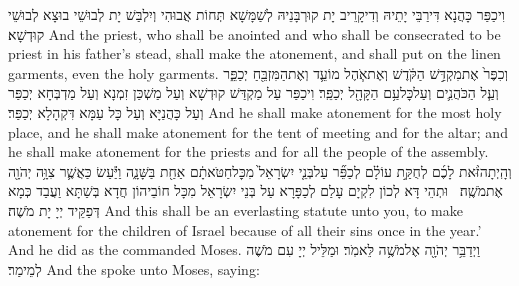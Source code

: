 {וִיכַפַּר כָּהֲנָא דִּירַבֵּי יָתֵיהּ וְדִיקָרֵיב יָת קוּרְבָּנֵיהּ לְשַׁמָּשָׁא תְּחוֹת אֲבוּהִי וְיִלְבַּשׁ יָת לְבוּשֵׁי בוּצָא לְבוּשֵׁי קוּדְשָׁא׃}
{And the priest, who shall be anointed and who shall be consecrated to be priest in his father’s stead, shall make the atonement, and shall put on the linen garments, even the holy garments.}{}
{וְכִפֶּר֙ אֶת\maqqaf מִקְדַּ֣שׁ הַקֹּ֔דֶשׁ וְאֶת\maqqaf אֹ֧הֶל מוֹעֵ֛ד וְאֶת\maqqaf הַמִּזְבֵּ֖חַ יְכַפֵּ֑ר וְעַ֧ל הַכֹּהֲנִ֛ים וְעַל\maqqaf כׇּל\maqqaf עַ֥ם הַקָּהָ֖ל יְכַפֵּֽר׃}
{וִיכַפַּר עַל מַקְדַּשׁ קוּדְשָׁא וְעַל מַשְׁכַּן זִמְנָא וְעַל מַדְבְּחָא יְכַפַּר וְעַל כָּהֲנַיָּא וְעַל כָּל עַמָּא דִּקְהָלָא יְכַפַּר׃}
{And he shall make atonement for the most holy place, and he shall make atonement for the tent of meeting and for the altar; and he shall make atonement for the priests and for all the people of the assembly.}{}
{וְהָֽיְתָה\maqqaf זֹּ֨את לָכֶ֜ם לְחֻקַּ֣ת עוֹלָ֗ם לְכַפֵּ֞ר עַל\maqqaf בְּנֵ֤י יִשְׂרָאֵל֙ מִכׇּל\maqqaf חַטֹּאתָ֔ם אַחַ֖ת בַּשָּׁנָ֑ה וַיַּ֕עַשׂ כַּאֲשֶׁ֛ר צִוָּ֥ה יְהֹוָ֖ה אֶת\maqqaf מֹשֶֽׁה׃ \petucha }
{וּתְהֵי דָּא לְכוֹן לִקְיָם עָלַם לְכַפָּרָא עַל בְּנֵי יִשְׂרָאֵל מִכָּל חוֹבֵיהוֹן חֲדָא בְּשַׁתָּא וַעֲבַד כְּמָא דְּפַקֵּיד יְיָ יָת מֹשֶׁה׃}
{And this shall be an everlasting statute unto you, to make atonement for the children of Israel because of all their sins once in the year.’ And he did as the \lord\space commanded Moses.}{}
\newperek
{}
{וַיְדַבֵּ֥ר יְהֹוָ֖ה אֶל\maqqaf מֹשֶׁ֥ה לֵּאמֹֽר׃}
{וּמַלֵּיל יְיָ עִם מֹשֶׁה לְמֵימַר׃}
{And the \lord\space spoke unto Moses, saying:}{}
